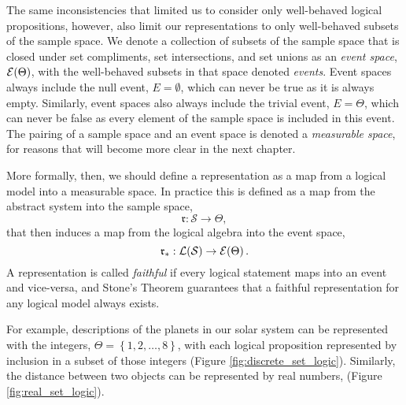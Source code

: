 The same inconsistencies that limited us to consider only well-behaved 
logical propositions, however, also limit our representations to only
well-behaved subsets of the sample space.  We denote a collection of 
subsets of the sample space that is closed under set compliments,
set intersections, and set unions as an \emph{event space}, $ \mathcal{E} \! \left( \Theta \right) $,
with the well-behaved subsets in that space denoted \emph{events}. 
Event spaces always include the null event, $E = \emptyset$, which 
can never be true as it is always empty.  Similarly, event spaces also 
always include the trivial event, $E = \Theta$, which can never be false
as every element of the sample space is included in this event.  
The pairing of a sample space and an event space is denoted a
\emph{measurable space}, for reasons that will become more clear
in the next chapter.

More formally, then, we should define a representation as a map from 
a logical model into a measurable space.  In practice this is defined 
as a map from the abstract system into the sample space,
%
\begin{equation*}
\mathfrak{r} : \mathcal{S} \rightarrow \Theta,
\end{equation*}
%
that then induces a map from the logical algebra into the event space,
%
\begin{equation*}
\mathfrak{r}_{*} : 
\mathcal{L} \! \left( \mathcal{S} \right) \rightarrow  \mathcal{E} \! \left( \Theta \right) .
\end{equation*}
%
A representation is called \emph{faithful} if every logical statement maps 
into an event and vice-versa, and Stone's Theorem guarantees that a
faithful representation for any logical model always exists.

For example, descriptions of the planets in our solar system can be 
represented with the integers, $\Theta = \left\{1, 2, \ldots, 8 \right\}$, 
with each logical proposition represented by inclusion in a subset of 
those integers (Figure \ref{fig:discrete_set_logic}).  Similarly, the 
distance between two objects can be represented by real numbers,
(Figure \ref{fig:real_set_logic}).

